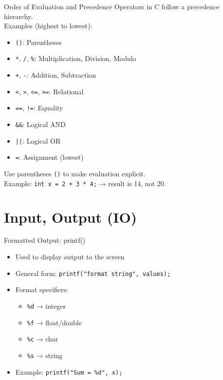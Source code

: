 \documentclass[12pt, aspectratio=169]{beamer}
\begin{document}
    \begin{frame}{Order of Evaluation and Precedence}
        Operators in C follow a precedence hierarchy.\\

        Examples (highest to lowest):
            \begin{itemize}
                \item \texttt{()}: Parentheses
                \item \texttt{*}, \texttt{/}, \texttt{\%}: Multiplication, Division, Modulo
                \item \texttt{+}, \texttt{-}: Addition, Subtraction
                \item \texttt{<}, \texttt{>}, \texttt{<=}, \texttt{>=}: Relational
                \item \texttt{==}, \texttt{!=}: Equality
                \item \texttt{\&\&}: Logical AND
                \item \texttt{||}: Logical OR
                \item \texttt{=}: Assignment (lowest)
            \end{itemize}
        Use parentheses \texttt{()} to make evaluation explicit.\\

        Example: \texttt{int x = 2 + 3 * 4;} → result is 14, not 20.
    \end{frame}


    \section{Input, Output (IO)}

    \begin{frame}{Formatted Output: printf()}
        \begin{itemize}
            \item Used to display output to the screen
            \item General form: \texttt{printf("format string", values);}
            \item Format specifiers:
                \begin{itemize}
                    \item \texttt{\%d} → integer
                    \item \texttt{\%f} → float/double
                    \item \texttt{\%c} → char
                    \item \texttt{\%s} → string
                \end{itemize}
            \item Example: \texttt{printf("Sum = \%d", x);}
        \end{itemize}
    \end{frame}
\end{document}
